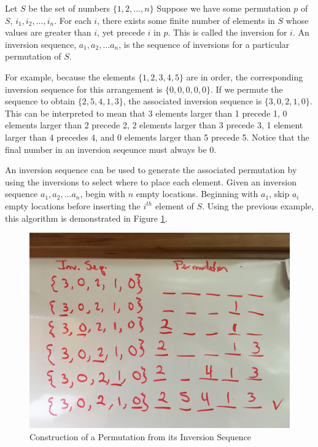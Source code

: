 Let $S$ be the set of numbers $\{1, 2, ..., n\}$ Suppose we have some permutation $p$ of $S$, $i_1, i_2, ..., i_n$. For each $i$, there exists some finite number of elements in $S$ whose values are greater than $i$, yet precede $i$ in $p$. This is called the inversion for $i$. An inversion sequence, $a_1, a_2, ... a_n$, is the sequence of inversions for a particular permutation of $S$.

For example, because the elements $\{1, 2, 3, 4, 5\}$ are in order, the corresponding inversion sequence for this arrangement is $\{0, 0, 0, 0, 0\}$. If we permute the sequence to obtain $\{2, 5, 4, 1, 3\}$, the associated inversion sequence is $\{3, 0, 2, 1, 0\}$. This can be interpreted to mean that 3 elements larger than 1 precede 1, 0 elements larger than 2 precede 2, 2 elements larger than 3 precede 3, 1 element larger than 4 precedes 4, and 0 elements larger than 5 precede 5. Notice that the final number in an inversion seqeunce must always be 0.

An inversion sequence can be used to generate the associated permutation by using the inversions to select where to place each element. Given an inversion sequence $a_1, a_2, ... a_n$, begin with $n$ empty locations. Beginning with $a_1$, skip $a_i$ empty locations before inserting the $i^{th}$ element of $S$. Using the previous example, this algorithm is demonstrated in Figure \ref{fig:inversion_sequence}.

\begin{figure}[htb]
\centering
\centerline{\includegraphics[origin=c,width=12cm]{../figures/inv-seq.jpg}}
\caption{Construction of a Permutation from its Inversion Sequence}
\label{fig:inversion_sequence}
\end{figure}

